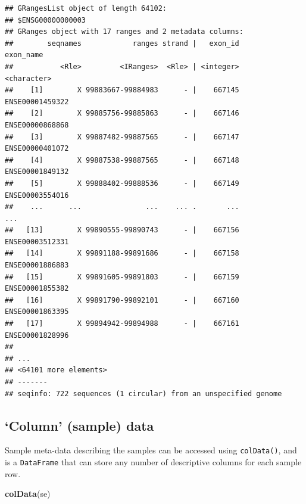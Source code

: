 \documentclass[]{article}
\newenvironment{Shaded}{\begin{snugshade}}{\end{snugshade}}
\newcommand{\KeywordTok}[1]{\textcolor[rgb]{0.13,0.29,0.53}{\textbf{#1}}}
\newcommand{\NormalTok}[1]{#1}
\begin{document}
\begin{verbatim}
## GRangesList object of length 64102:
## $ENSG00000000003 
## GRanges object with 17 ranges and 2 metadata columns:
##        seqnames            ranges strand |   exon_id       exon_name
##           <Rle>         <IRanges>  <Rle> | <integer>     <character>
##    [1]        X 99883667-99884983      - |    667145 ENSE00001459322
##    [2]        X 99885756-99885863      - |    667146 ENSE00000868868
##    [3]        X 99887482-99887565      - |    667147 ENSE00000401072
##    [4]        X 99887538-99887565      - |    667148 ENSE00001849132
##    [5]        X 99888402-99888536      - |    667149 ENSE00003554016
##    ...      ...               ...    ... .       ...             ...
##   [13]        X 99890555-99890743      - |    667156 ENSE00003512331
##   [14]        X 99891188-99891686      - |    667158 ENSE00001886883
##   [15]        X 99891605-99891803      - |    667159 ENSE00001855382
##   [16]        X 99891790-99892101      - |    667160 ENSE00001863395
##   [17]        X 99894942-99894988      - |    667161 ENSE00001828996
## 
## ...
## <64101 more elements>
## -------
## seqinfo: 722 sequences (1 circular) from an unspecified genome
\end{verbatim}

\hypertarget{column-sample-data}{%
\subsection{`Column' (sample) data}\label{column-sample-data}}

Sample meta-data describing the samples can be accessed using
\texttt{colData()}, and is a \texttt{DataFrame} that can store any
number of descriptive columns for each sample row.

\begin{Shaded}
\begin{Highlighting}[]
\KeywordTok{colData}\NormalTok{(se)}
\end{Highlighting}
\end{Shaded}
\end{document}
